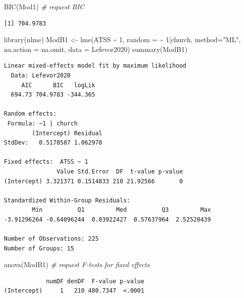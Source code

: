 \documentclass[
  english,
]{book}
\newenvironment{Shaded}{\begin{snugshade}}{\end{snugshade}}
\newcommand{\AttributeTok}[1]{\textcolor[rgb]{0.77,0.63,0.00}{#1}}
\newcommand{\CommentTok}[1]{\textcolor[rgb]{0.56,0.35,0.01}{\textit{#1}}}
\newcommand{\DecValTok}[1]{\textcolor[rgb]{0.00,0.00,0.81}{#1}}
\newcommand{\FunctionTok}[1]{\textcolor[rgb]{0.00,0.00,0.00}{#1}}
\newcommand{\NormalTok}[1]{#1}
\newcommand{\OtherTok}[1]{\textcolor[rgb]{0.56,0.35,0.01}{#1}}
\newcommand{\SpecialCharTok}[1]{\textcolor[rgb]{0.00,0.00,0.00}{#1}}
\newcommand{\StringTok}[1]{\textcolor[rgb]{0.31,0.60,0.02}{#1}}
\begin{document}
\begin{Shaded}
\begin{Highlighting}[]
\FunctionTok{BIC}\NormalTok{(Mod1) }\CommentTok{\# request BIC}
\end{Highlighting}
\end{Shaded}

\begin{verbatim}
[1] 704.9783
\end{verbatim}

\begin{Shaded}
\begin{Highlighting}[]
\FunctionTok{library}\NormalTok{(nlme)}
\NormalTok{ModB1 }\OtherTok{\textless{}{-}} \FunctionTok{lme}\NormalTok{(ATSS }\SpecialCharTok{\textasciitilde{}} \DecValTok{1}\NormalTok{, }\AttributeTok{random =} \SpecialCharTok{\textasciitilde{}} \DecValTok{1}\SpecialCharTok{|}\NormalTok{church, }\AttributeTok{method=}\StringTok{"ML"}\NormalTok{, }\AttributeTok{na.action =}\NormalTok{ na.omit, }\AttributeTok{data =}\NormalTok{ Lefevor2020)}
\FunctionTok{summary}\NormalTok{(ModB1)}
\end{Highlighting}
\end{Shaded}

\begin{verbatim}
Linear mixed-effects model fit by maximum likelihood
  Data: Lefevor2020 
     AIC      BIC   logLik
  694.73 704.9783 -344.365

Random effects:
 Formula: ~1 | church
        (Intercept) Residual
StdDev:   0.5170587 1.062978

Fixed effects:  ATSS ~ 1 
               Value Std.Error  DF  t-value p-value
(Intercept) 3.321371 0.1514833 210 21.92566       0

Standardized Within-Group Residuals:
        Min          Q1         Med          Q3         Max 
-3.91296264 -0.64096244  0.03922427  0.57637964  2.52520439 

Number of Observations: 225
Number of Groups: 15 
\end{verbatim}

\begin{Shaded}
\begin{Highlighting}[]
\FunctionTok{anova}\NormalTok{(ModB1) }\CommentTok{\# request F{-}tests for fixed effects}
\end{Highlighting}
\end{Shaded}

\begin{verbatim}
            numDF denDF  F-value p-value
(Intercept)     1   210 480.7347  <.0001
\end{verbatim}
\end{document}
